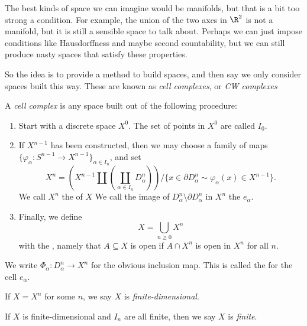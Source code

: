 \documentclass[a4paper]{article}
\theoremstyle{definition}
\begin{document}
The best kinds of space we can imagine would be manifolds, but that is a bit too strong a condition. For example, the union of the two axes in $\R^2$ is not a manifold, but it is still a sensible space to talk about. Perhaps we can just impose conditions like Hausdorffness and maybe second countability, but we can still produce nasty spaces that satisfy these properties.

So the idea is to provide a method to build spaces, and then say we only consider spaces built this way. These are known as \emph{cell complexes}, or \emph{CW complexes}

\begin{defi}
  A \emph{cell complex} is any space built out of the following procedure:
  \begin{enumerate}
    \item Start with a discrete space $X^0$. The set of points in $X^0$ are called $I_0$.
    \item If $X^{n - 1}$ has been constructed, then we may choose a family of maps $\{\varphi_\alpha: S^{n - 1} \to X^{n - 1}\}_{\alpha \in I_n}$, and set
      \[
        X^n = \left(X^{n - 1} \amalg \left(\coprod_{\alpha \in I_n} D_\alpha^n\right) \right)/\{x \in \partial D_\alpha^n \sim \varphi_\alpha(x) \in X^{n - 1}\}.
      \]
      We call $X^n$ the  of $X$ We call the image of $D_\alpha^n \setminus \partial D_\alpha^n$ in $X^n$ the  $e_\alpha$.
    \item Finally, we define
      \[
        X = \bigcup_{n \geq 0} X^n
      \]
      with the , namely that $A \subseteq X$ is open if $A \cap X^n$ is open in $X^n$ for all $n$.
  \end{enumerate}
\end{defi}
We write $\Phi_\alpha: D_\alpha^n \to X^n$ for the obvious inclusion map. This is called the  for the cell $e_\alpha$.

\begin{defi}
  If $X = X^n$ for some $n$, we say $X$ is \emph{finite-dimensional}.
\end{defi}

\begin{defi}
  If $X$ is finite-dimensional and $I_n$ are all finite, then we say $X$ is \emph{finite}.
\end{defi}
\end{document}
